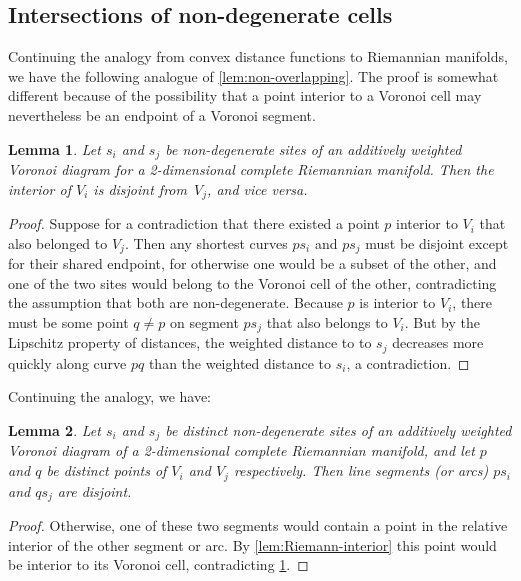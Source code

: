\documentclass[11pt]{article}
\newtheorem{lemma}{Lemma}
\theoremstyle{definition}
\begin{document}
\iffull
\subsection{Intersections of non-degenerate cells}
\label{sec:riemann-vor2} 

Continuing the analogy from convex distance functions to Riemannian manifolds, we have the following analogue of \cref{lem:non-overlapping}. The proof is somewhat different because of the possibility that a point interior to a Voronoi cell may nevertheless be an endpoint of a Voronoi segment.

\begin{lemma}
\label{lem:Riemann-non-overlapping}
Let $s_i$ and $s_j$ be non-degenerate sites of an additively weighted Voronoi diagram for a 2-dimensional complete Riemannian manifold. Then the interior of $V_i$ is disjoint from~$V_j$, and vice versa.
\end{lemma}

\begin{proof}
Suppose for a contradiction that there existed a point $p$ interior to $V_i$ that also belonged to $V_j$. Then any shortest curves $ps_i$ and $ps_j$ must be disjoint except for their shared endpoint, for otherwise one would be a subset of the other, and one of the two sites would belong to the Voronoi cell of the other, contradicting the assumption that both are non-degenerate. Because $p$ is interior to $V_i$, there must be some point $q\ne p$ on segment $ps_j$ that also belongs to $V_i$. But by the Lipschitz property of distances, the weighted distance to to $s_j$ decreases more quickly along curve $pq$ than the weighted distance to $s_i$, a contradiction.
\end{proof}

Continuing the analogy, we have:

\begin{lemma}
\label{lem:Riemann-disjoint-segments}
Let $s_i$ and $s_j$ be distinct non-degenerate sites of an additively weighted Voronoi diagram of a 2-dimensional complete Riemannian manifold, and let $p$ and $q$ be distinct points of $V_i$ and $V_j$ respectively. Then line segments (or arcs)  $ps_i$ and $qs_j$ are disjoint.
\end{lemma}

\begin{proof}
Otherwise, one of these two segments would contain a point in the relative interior of the other segment or arc. By \cref{lem:Riemann-interior} this point would be interior to its Voronoi cell, contradicting \cref{lem:Riemann-non-overlapping}.
\end{proof}
\end{document}

